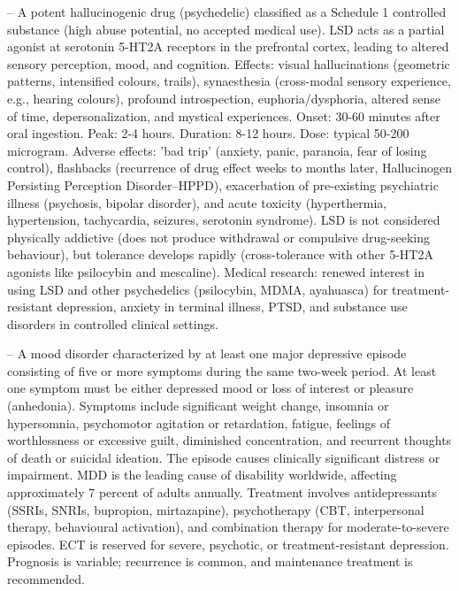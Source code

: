 -- A potent hallucinogenic drug (psychedelic) classified as a Schedule 1 controlled substance (high abuse potential, no accepted medical use). LSD acts as a partial agonist at serotonin 5-HT2A receptors in the prefrontal cortex, leading to altered sensory perception, mood, and cognition. Effects: visual hallucinations (geometric patterns, intensified colours, trails), synaesthesia (cross-modal sensory experience, e.g., hearing colours), profound introspection, euphoria/dysphoria, altered sense of time, depersonalization, and mystical experiences. Onset: 30-60 minutes after oral ingestion. Peak: 2-4 hours. Duration: 8-12 hours. Dose: typical 50-200 microgram. Adverse effects: 'bad trip' (anxiety, panic, paranoia, fear of losing control), flashbacks (recurrence of drug effect weeks to months later, Hallucinogen Persisting Perception Disorder--HPPD), exacerbation of pre-existing psychiatric illness (psychosis, bipolar disorder), and acute toxicity (hyperthermia, hypertension, tachycardia, seizures, serotonin syndrome). LSD is not considered physically addictive (does not produce withdrawal or compulsive drug-seeking behaviour), but tolerance develops rapidly (cross-tolerance with other 5-HT2A agonists like psilocybin and mescaline). Medical research: renewed interest in using LSD and other psychedelics (psilocybin, MDMA, ayahuasca) for treatment-resistant depression, anxiety in terminal illness, PTSD, and substance use disorders in controlled clinical settings.

-- A mood disorder characterized by at least one major depressive episode consisting of five or more symptoms during the same two-week period. At least one symptom must be either depressed mood or loss of interest or pleasure (anhedonia). Symptoms include significant weight change, insomnia or hypersomnia, psychomotor agitation or retardation, fatigue, feelings of worthlessness or excessive guilt, diminished concentration, and recurrent thoughts of death or suicidal ideation. The episode causes clinically significant distress or impairment. MDD is the leading cause of disability worldwide, affecting approximately 7 percent of adults annually. Treatment involves antidepressants (SSRIs, SNRIs, bupropion, mirtazapine), psychotherapy (CBT, interpersonal therapy, behavioural activation), and combination therapy for moderate-to-severe episodes. ECT is reserved for severe, psychotic, or treatment-resistant depression. Prognosis is variable; recurrence is common, and maintenance treatment is recommended.

